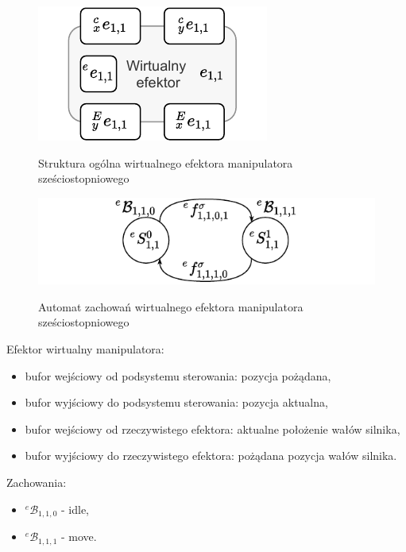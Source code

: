 \begin{figure}
    \centering
    \includegraphics[width=0.75\columnwidth]{figures/ISR-ve-manip-model.pdf}
    \label{fig:model-vr-camera}
    \caption{Struktura ogólna wirtualnego efektora manipulatora sześciostopniowego}
\end{figure}

\begin{figure}
    \centering
    \includegraphics[width=\columnwidth]{figures/ISR-ve-manip-behaviours.pdf}
    \label{fig:zachowania-ve-manip}
    \caption{Automat zachowań wirtualnego efektora manipulatora sześciostopniowego}
\end{figure}

Efektor wirtualny manipulatora:
\begin{itemize}
    \item bufor wejściowy od podsystemu sterowania: pozycja pożądana,
    \item bufor wyjściowy do podsystemu sterowania: pozycja aktualna,
    \item bufor wejściowy od rzeczywistego efektora: aktualne położenie wałów silnika,
    \item bufor wyjściowy do rzeczywistego efektora: pożądana pozycja wałów silnika.
\end{itemize}


Zachowania:
\begin{itemize}
    \item ${}^{e}\mathcal{B}_{1,1,0}$ - idle,
    \item ${}^{e}\mathcal{B}_{1,1,1}$ - move.
\end{itemize}